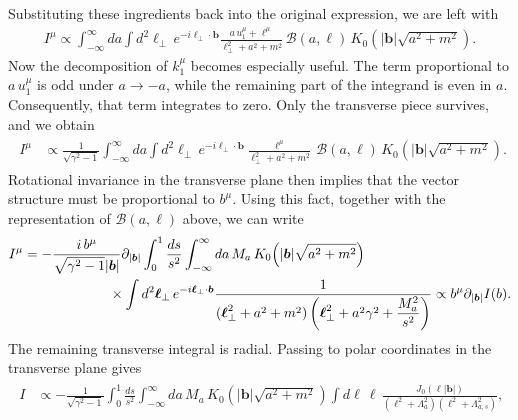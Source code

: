 Substituting these ingredients back into the original expression, we are left with
\begin{align}
I^\mu
\propto
\int_{-\infty}^{\infty} da
\int d^2\boldsymbol{\ell}_\perp\,
e^{-i\boldsymbol{\ell}_\perp\cdot\boldsymbol{b}}
\frac{a\,u_1^\mu+\ell^\mu}{\boldsymbol{\ell}_\perp^2+a^2+m^2}\,
\mathcal{B}(a,\ell)\,
K_0\!\left(|\boldsymbol{b}|\sqrt{a^2+m^2}\right).
\end{align}
Now the decomposition of $k_1^\mu$ becomes especially useful. The term proportional to $a\,u_1^\mu$ is odd under $a\to -a$, while the remaining part of the integrand is even in $a$. Consequently, that term integrates to zero. Only the transverse piece survives, and we obtain
\begin{align}
\begin{split}
I^\mu
&\propto
\frac{1}{\sqrt{\gamma^2-1}}
\int_{-\infty}^{\infty} da
\int d^2\boldsymbol{\ell}_\perp\,
e^{-i\boldsymbol{\ell}_\perp\cdot\boldsymbol{b}}
\frac{\ell^\mu}{\boldsymbol{\ell}_\perp^2+a^2+m^2}\,
\mathcal{B}(a,\ell)\,
K_0\!\left(|\boldsymbol{b}|\sqrt{a^2+m^2}\right).
\end{split}
\end{align}
Rotational invariance in the transverse plane then implies that the vector structure must be proportional to $b^\mu$. Using this fact, together with the representation of $\mathcal{B}(a,\ell)$ above, we can write
\begin{align}
\begin{split}
I^\mu
&=
-\frac{i\,b^\mu}{\sqrt{\gamma^2-1}|\boldsymbol{b}|}\partial_{|\boldsymbol{b}|}
\int_0^1\frac{ds}{s^2}
\int_{-\infty}^{\infty} da\,M_a\,
K_0\!\left(|\boldsymbol{b}|\sqrt{a^2+m^2}\right)
\\
&\hspace{2.2cm}\times
\int d^2\boldsymbol{\ell}_\perp\,
e^{-i\boldsymbol{\ell}_\perp\cdot\boldsymbol{b}}
\frac{1}{
(\boldsymbol{\ell}_\perp^2+a^2+m^2)
\left(\boldsymbol{\ell}_\perp^2+a^2\gamma^2+\dfrac{M_a^2}{s^2}\right)}\propto b^\mu \partial_{|\boldsymbol{b}|
}I(b).
\end{split}
\end{align}
The remaining transverse integral is radial. Passing to polar coordinates in the transverse plane gives
\begin{align}
\begin{split}
I
&\propto
-\frac{1}{\sqrt{\gamma^2-1}}
\int_0^1\frac{ds}{s^2}
\int_{-\infty}^{\infty} da\,M_a\,
K_0\!\left(|\boldsymbol{b}|\sqrt{a^2+m^2}\right)
\int d\ell\,\ell\,
\frac{J_0(\ell|\boldsymbol{b}|)}
{(\ell^2+\Lambda_a^2)(\ell^2+\Lambda_{a,s}^2)},
\end{split}
\end{align}
